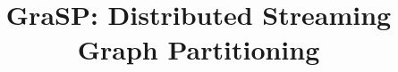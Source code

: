 \documentclass{sig-alternate}
\begin{document}
%

\title{GraSP: Distributed Streaming Graph Partitioning}
%
%
%
%
%
\end{document}
